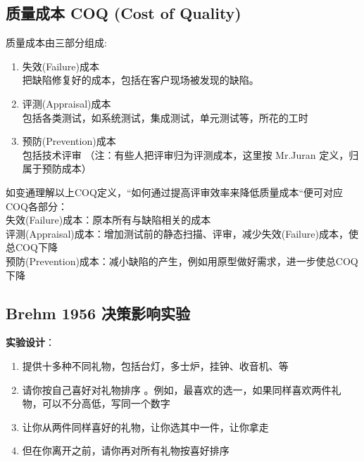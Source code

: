 \hypertarget{ux8d28ux91cfux6210ux672c-coq-cost-of-quality}{%
\subsection{质量成本 COQ (Cost of
Quality)}\label{ux8d28ux91cfux6210ux672c-coq-cost-of-quality}}

质量成本由三部分组成:

\begin{enumerate}
\tightlist
\item
  失效(Failure)成本\\
  把缺陷修复好的成本，包括在客户现场被发现的缺陷。
\item
  评测(Appraisal)成本\\
  包括各类测试，如系统测试，集成测试，单元测试等，所花的工时
\item
  预防(Prevention)成本\\
  包括技术评审 （注：有些人把评审归为评测成本，这里按 Mr.Juran
  定义，归属于预防成本）
\end{enumerate}

如变通理解以上COQ定义，``如何通过提高评审效率来降低质量成本``便可对应COQ各部分：\\
失效(Failure)成本：原本所有与缺陷相关的成本\\
评测(Appraisal)成本：增加测试前的静态扫描、评审，减少失效(Failure)成本，使总COQ下降\\
预防(Prevention)成本：减小缺陷的产生，例如用原型做好需求，进一步使总COQ下降\\

\hypertarget{brehm-1956-ux51b3ux7b56ux5f71ux54cdux5b9eux9a8c}{%
\subsection{Brehm 1956
决策影响实验}\label{brehm-1956-ux51b3ux7b56ux5f71ux54cdux5b9eux9a8c}}

\textbf{实验设计}：

\begin{enumerate}
\tightlist
\item
  提供十多种不同礼物，包括台灯，多士炉，挂钟、收音机、等
\item
  请你按自己喜好对礼物排序
  。例如，最喜欢的选一，如果同样喜欢两件礼物，可以不分高低，写同一个数字
\item
  让你从两件同样喜好的礼物，让你选其中一件，让你拿走
\item
  但在你离开之前，请你再对所有礼物按喜好排序
\end{enumerate}

